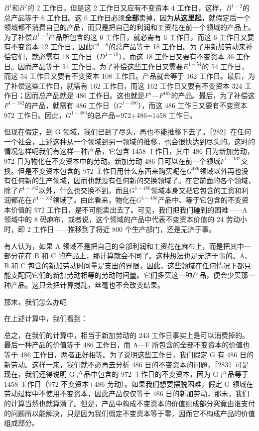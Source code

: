 $B^{1}$和$B^{2}$的 2 工作日。但是这 2 工作日又应有不变资本 4 工作日，这样，$B^{1-2}$的总产品等于 6 工作日。这 6 工作日必须\textbf{全部}卖掉，因为\textbf{从这里起}，就假定后一个领域都不消费自己的产品，而只是把自己的利润和工资花在前一个领域的产品上。为了补偿$B^{1-2}$产品所包含的这 6 工作日，就必需有 6 工作日，而这 6 工作日又要有不变资本 12 工作日。因此$C^{1-6}$的总产品等于 18 工作日。为了用新加劳动来补偿它们，就必需有 18 工作日（$D^{1-18}$），而这 18 工作日又要有不变资本 36 工作日。因而产品等于 54 工作日。为了补偿这些工作日又需要$E^{1-54}$的 54 工作日，而这 54 工作日又要有不变资本 108 工作日。产品就会等于 162 工作日。最后，为了补偿这些工作日，就需有 162 工作日，而这 162 工作日又要有不变资本 324 工作日；因而总产品就是 486 工作日。这也就是$F^{1}$—$F^{162}$的产品。最后，为了补偿这$F^{1-162}$的产品，就需有 486 工作日（$G^{1-486}$），而这 486 工作日又要有不变资本 972 工作日。因此，$G^{1-486}$的总产品=972+486=1458 工作日。

但现在假定，到 G 领域，我们已到了尽头，再也不能推移下去了。［282］在任何一个社会，上述这种从一个领域到另一领域的推移，也会很快达到尽头的。这时的情况怎样呢我们有这样一种产品，它包含 1458 工作日，其中 486 日为新加劳动，972 日为物化在不变资本中的劳动。新加劳动 486 日可以在前一个领域$F^{1-162}$交换。但是不变资本包含的 972 工作日用什么东西来购买呢在$G^{486}$领域以外再也没有任何新的生产领域，因而也就没有任何新的交换领域了。在它前面的各个领域，除了$F^{1-162}$以外，什么也交换不到。而且$G^{1-486}$领域本身又把它包含的工资和利润都花在$F^{1-162}$领域了。由此看来，物化在$G^{1-486}$产品中、等于它包含的不变资本价值的 972 工作日，是不可能卖出去了。可见，我们把我们碰到的困难——A 领域中的 8 码麻布，或者说，这个领域的产品中代表不变资本价值的 24 劳动小时，即 2 工作日——推移到了将近 800 个生产部门，还是无济于事。

有人认为，如果 A 领域不是把自己的全部利润和工资花在麻布上，而是把其中一部分花在 B 和 C 的产品上，那计算就会不同了。这种想法也是无济于事的。A、B 和 C 包含的新加劳动时间量是支出的界限，因此，这些领域在任何情况下都只能支配同它们的新加劳动相等的劳动时间量。它们多买这一种产品，便会少买那一种产品。这只会把计算搅乱，丝毫也不会改变结果。

那末，我们怎么办呢

在上述计算中，我们看到：

总之，在我们的计算中，相当于新加劳动的 243 工作日事实上是可以消费掉的。最后一种产品的价值等于 486 工作日，而 A—F 所包含的全部不变资本的价值也等于 486 工作日，两者正好相等。为了说明这些工作日，我们假定 G 有 486 日的新劳动。这样一来，我们就不必再去分析 486 日的不变资本的问题，［283］可是现在，我们还得说明 G 产品中包含的 972 工作日的不变资本，因为 G 产品等于 1458 工作日（972 不变资本+486 劳动）。如果我们想要摆脱困难，假定 G 领域在劳动过程中不使用不变资本，因此产品仅仅等于 486 日的新加劳动，那末，我们的计算当然也就算清了。但是，产品中构成不变资本的价值组成部分究竟由谁支付的问题所以能解决，只是因为我们假定不变资本等于零，因而它不构成产品的价值组成部分。

